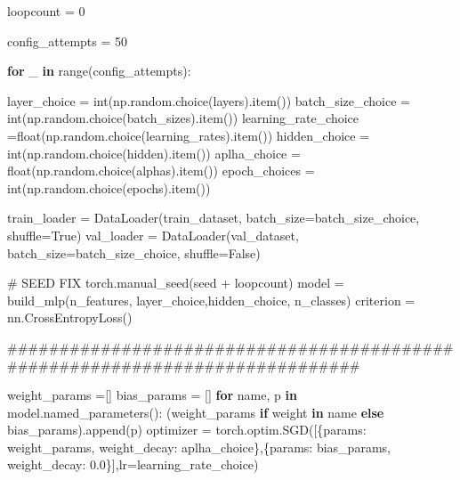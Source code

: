 \documentclass[
  letterpaper,
  DIV=11,
  numbers=noendperiod]{scrartcl}
\newenvironment{Shaded}{\begin{snugshade}}{\end{snugshade}}
\newcommand{\BuiltInTok}[1]{\textcolor[rgb]{0.00,0.23,0.31}{#1}}
\newcommand{\CommentTok}[1]{\textcolor[rgb]{0.37,0.37,0.37}{#1}}
\newcommand{\ControlFlowTok}[1]{\textcolor[rgb]{0.00,0.23,0.31}{\textbf{#1}}}
\newcommand{\DecValTok}[1]{\textcolor[rgb]{0.68,0.00,0.00}{#1}}
\newcommand{\FloatTok}[1]{\textcolor[rgb]{0.68,0.00,0.00}{#1}}
\newcommand{\KeywordTok}[1]{\textcolor[rgb]{0.00,0.23,0.31}{\textbf{#1}}}
\newcommand{\NormalTok}[1]{\textcolor[rgb]{0.00,0.23,0.31}{#1}}
\newcommand{\OperatorTok}[1]{\textcolor[rgb]{0.37,0.37,0.37}{#1}}
\newcommand{\StringTok}[1]{\textcolor[rgb]{0.13,0.47,0.30}{#1}}
\newcommand{\VariableTok}[1]{\textcolor[rgb]{0.07,0.07,0.07}{#1}}
\begin{document}
\begin{Shaded}
\begin{Highlighting}[]
\NormalTok{    loopcount }\OperatorTok{=} \DecValTok{0}

\NormalTok{    config\_attempts }\OperatorTok{=} \DecValTok{50}



    \ControlFlowTok{for}\NormalTok{ \_ }\KeywordTok{in} \BuiltInTok{range}\NormalTok{(config\_attempts):}


\NormalTok{        layer\_choice }\OperatorTok{=}  \BuiltInTok{int}\NormalTok{(np.random.choice(layers).item())}
\NormalTok{        batch\_size\_choice }\OperatorTok{=} \BuiltInTok{int}\NormalTok{(np.random.choice(batch\_sizes).item())}
\NormalTok{        learning\_rate\_choice }\OperatorTok{=}\BuiltInTok{float}\NormalTok{(np.random.choice(learning\_rates).item())}
\NormalTok{        hidden\_choice }\OperatorTok{=} \BuiltInTok{int}\NormalTok{(np.random.choice(hidden).item())}
\NormalTok{        aplha\_choice }\OperatorTok{=} \BuiltInTok{float}\NormalTok{(np.random.choice(alphas).item())}
\NormalTok{        epoch\_choices }\OperatorTok{=} \BuiltInTok{int}\NormalTok{(np.random.choice(epochs).item())}

\NormalTok{        train\_loader }\OperatorTok{=}\NormalTok{ DataLoader(train\_dataset, batch\_size}\OperatorTok{=}\NormalTok{batch\_size\_choice, shuffle}\OperatorTok{=}\VariableTok{True}\NormalTok{)}
\NormalTok{        val\_loader   }\OperatorTok{=}\NormalTok{ DataLoader(val\_dataset,   batch\_size}\OperatorTok{=}\NormalTok{batch\_size\_choice, shuffle}\OperatorTok{=}\VariableTok{False}\NormalTok{)}

        \CommentTok{\# SEED FIX}
\NormalTok{        torch.manual\_seed(seed }\OperatorTok{+}\NormalTok{ loopcount)}
\NormalTok{        model }\OperatorTok{=}\NormalTok{ build\_mlp(n\_features, layer\_choice,hidden\_choice, n\_classes)}
\NormalTok{        criterion }\OperatorTok{=}\NormalTok{ nn.CrossEntropyLoss()}

        \CommentTok{\#\#\#\#\#\#\#\#\#\#\#\#\#\#\#\#\#\#\#\#\#\#\#\#\#\#\#\#\#\#\#\#\#\#\#\#\#\#\#\#\#\#\#\#\#\#\#\#\#\#\#\#\#\#\#\#\#\#\#\#\#\#\#\#\#\#\#\#\#\#\#\#\#\#\#\#\# }


\NormalTok{        weight\_params }\OperatorTok{=}\NormalTok{[]}
\NormalTok{        bias\_params }\OperatorTok{=}\NormalTok{ []}
        \ControlFlowTok{for}\NormalTok{ name, p }\KeywordTok{in}\NormalTok{ model.named\_parameters():}
\NormalTok{            (weight\_params }\ControlFlowTok{if} \StringTok{\textquotesingle{}weight\textquotesingle{}} \KeywordTok{in}\NormalTok{ name }\ControlFlowTok{else}\NormalTok{ bias\_params).append(p)}
\NormalTok{        optimizer }\OperatorTok{=}\NormalTok{ torch.optim.SGD([\{}\StringTok{\textquotesingle{}params\textquotesingle{}}\NormalTok{: weight\_params, }\StringTok{\textquotesingle{}weight\_decay\textquotesingle{}}\NormalTok{: aplha\_choice\},\{}\StringTok{\textquotesingle{}params\textquotesingle{}}\NormalTok{: bias\_params,   }\StringTok{\textquotesingle{}weight\_decay\textquotesingle{}}\NormalTok{: }\FloatTok{0.0}\NormalTok{\}],lr}\OperatorTok{=}\NormalTok{learning\_rate\_choice)}





\end{Highlighting}
\end{Shaded}
\end{document}
